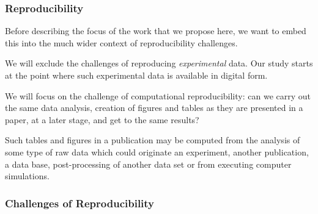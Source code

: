 \medskip

\subsubsection{Reproducibility}\label{sec:concept}\label{sec:reproducibility}

Before describing the focus of the work that we propose here, we want to embed
this into the much wider context of reproducibility challenges.

We will exclude the challenges of reproducing \emph{experimental} data. Our
study starts at the point where such experimental data is available in digital
form.

We will focus on the challenge of computational reproducibility: can we carry out
the same data analysis, creation of figures and tables as they are presented in
a paper, at a later stage, and get to the same results?

Such tables and figures in a publication may be computed from the analysis of
some type of raw data which could originate an experiment, another publication,
a data base, post-processing of another data set or from executing computer
simulations.


\subsubsection{Challenges of Reproducibility}\label{sec:reproducibility-challenges}

